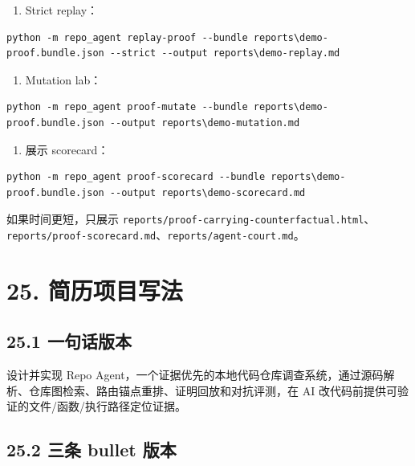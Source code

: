 \documentclass[UTF8,12pt,openany]{ctexbook}
\begin{document}
\begin{enumerate}
\item Strict replay：
\end{enumerate}

\begin{lstlisting}
python -m repo_agent replay-proof --bundle reports\demo-proof.bundle.json --strict --output reports\demo-replay.md
\end{lstlisting}

\begin{enumerate}
\item Mutation lab：
\end{enumerate}

\begin{lstlisting}
python -m repo_agent proof-mutate --bundle reports\demo-proof.bundle.json --output reports\demo-mutation.md
\end{lstlisting}

\begin{enumerate}
\item 展示 scorecard：
\end{enumerate}

\begin{lstlisting}
python -m repo_agent proof-scorecard --bundle reports\demo-proof.bundle.json --output reports\demo-scorecard.md
\end{lstlisting}

如果时间更短，只展示 \texttt{reports/proof-carrying-counterfactual.html}、\texttt{reports/proof-scorecard.md}、\texttt{reports/agent-court.md}。\par

\section{25. 简历项目写法}

\subsection{25.1 一句话版本}

设计并实现 Repo Agent，一个证据优先的本地代码仓库调查系统，通过源码解析、仓库图检索、路由锚点重排、证明回放和对抗评测，在 AI 改代码前提供可验证的文件/函数/执行路径定位证据。\par

\subsection{25.2 三条 bullet 版本}
\end{document}
